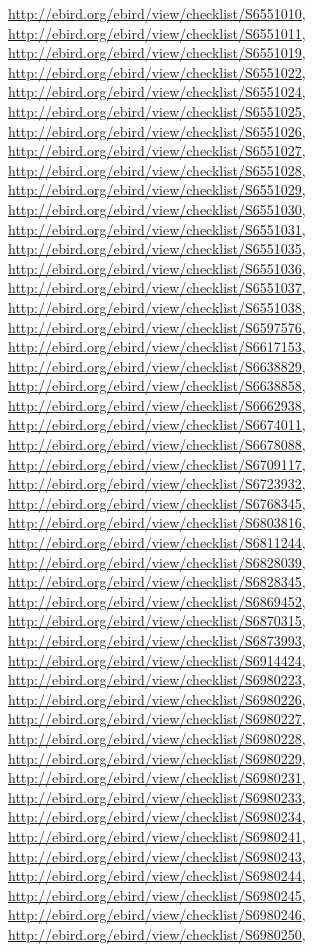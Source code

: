 \documentclass[9pt, article]{memoir}
\begin{document}
\begin{multicols}{2}
\url{http://ebird.org/ebird/view/checklist/S6551010}, 
\url{http://ebird.org/ebird/view/checklist/S6551011}, 
\url{http://ebird.org/ebird/view/checklist/S6551019}, 
\url{http://ebird.org/ebird/view/checklist/S6551022}, 
\url{http://ebird.org/ebird/view/checklist/S6551024}, 
\url{http://ebird.org/ebird/view/checklist/S6551025}, 
\url{http://ebird.org/ebird/view/checklist/S6551026}, 
\url{http://ebird.org/ebird/view/checklist/S6551027}, 
\url{http://ebird.org/ebird/view/checklist/S6551028}, 
\url{http://ebird.org/ebird/view/checklist/S6551029}, 
\url{http://ebird.org/ebird/view/checklist/S6551030}, 
\url{http://ebird.org/ebird/view/checklist/S6551031}, 
\url{http://ebird.org/ebird/view/checklist/S6551035}, 
\url{http://ebird.org/ebird/view/checklist/S6551036}, 
\url{http://ebird.org/ebird/view/checklist/S6551037}, 
\url{http://ebird.org/ebird/view/checklist/S6551038}, 
\url{http://ebird.org/ebird/view/checklist/S6597576}, 
\url{http://ebird.org/ebird/view/checklist/S6617153}, 
\url{http://ebird.org/ebird/view/checklist/S6638829}, 
\url{http://ebird.org/ebird/view/checklist/S6638858}, 
\url{http://ebird.org/ebird/view/checklist/S6662938}, 
\url{http://ebird.org/ebird/view/checklist/S6674011}, 
\url{http://ebird.org/ebird/view/checklist/S6678088}, 
\url{http://ebird.org/ebird/view/checklist/S6709117}, 
\url{http://ebird.org/ebird/view/checklist/S6723932}, 
\url{http://ebird.org/ebird/view/checklist/S6768345}, 
\url{http://ebird.org/ebird/view/checklist/S6803816}, 
\url{http://ebird.org/ebird/view/checklist/S6811244}, 
\url{http://ebird.org/ebird/view/checklist/S6828039}, 
\url{http://ebird.org/ebird/view/checklist/S6828345}, 
\url{http://ebird.org/ebird/view/checklist/S6869452}, 
\url{http://ebird.org/ebird/view/checklist/S6870315}, 
\url{http://ebird.org/ebird/view/checklist/S6873993}, 
\url{http://ebird.org/ebird/view/checklist/S6914424}, 
\url{http://ebird.org/ebird/view/checklist/S6980223}, 
\url{http://ebird.org/ebird/view/checklist/S6980226}, 
\url{http://ebird.org/ebird/view/checklist/S6980227}, 
\url{http://ebird.org/ebird/view/checklist/S6980228}, 
\url{http://ebird.org/ebird/view/checklist/S6980229}, 
\url{http://ebird.org/ebird/view/checklist/S6980231}, 
\url{http://ebird.org/ebird/view/checklist/S6980233}, 
\url{http://ebird.org/ebird/view/checklist/S6980234}, 
\url{http://ebird.org/ebird/view/checklist/S6980241}, 
\url{http://ebird.org/ebird/view/checklist/S6980243}, 
\url{http://ebird.org/ebird/view/checklist/S6980244}, 
\url{http://ebird.org/ebird/view/checklist/S6980245}, 
\url{http://ebird.org/ebird/view/checklist/S6980246}, 
\url{http://ebird.org/ebird/view/checklist/S6980250}, 

\end{multicols}
\end{document}
